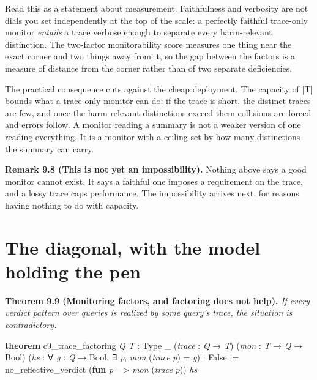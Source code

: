 \documentclass{memoir}
\begin{document}
Read this as a statement about measurement. Faithfulness and verbosity are not
dials you set independently at the top of the scale: a perfectly faithful
trace-only monitor \emph{entails} a trace verbose enough to separate every
harm-relevant distinction. The two-factor monitorability score measures one
thing near the exact corner and two things away from it, so the gap between the
factors is a measure of distance from the corner rather than of two separate
deficiencies.

The practical consequence cuts against the cheap deployment. The capacity of \LeanVerb|T|
bounds what a trace-only monitor can do: if the trace is short, the distinct
traces are few, and once the harm-relevant distinctions exceed them collisions
are forced and errors follow. A monitor reading a summary is not a weaker
version of one reading everything. It is a monitor with a ceiling set by how
many distinctions the summary can carry.

\textbf{Remark 9.8 (This is not yet an impossibility).} Nothing above says a good monitor
cannot exist. It says a faithful one imposes a requirement on the trace, and a
lossy trace caps performance. The impossibility arrives next, for reasons having
nothing to do with capacity.



\section{The diagonal, with the model holding the pen}\label{Two--Schemas--of--Impossibility-005F-005F-005F--Machine--Checked--Limits--of--Trustworthy--Machine--Learning-005F-005F-005F--and--Why--They--Tighten--with--Capability----The--Trace--Is--Not--a--Window----The--diagonal-005F-005F-005F--with--the--model--holding--the--pen}

\textbf{Theorem 9.9 (Monitoring factors, and factoring does not help).} \emph{If every verdict
pattern over queries is realized by some query's trace, the situation is
contradictory.}

\begin{LeanVerbatim}
\textbf{theorem} c9_trace_factoring \textit{Q} \textit{T} : Type _
    (\textit{trace} : \textit{Q} → \textit{T}) (\textit{mon} : \textit{T} → \textit{Q} → Bool)
    (\textit{hs} : ∀ \textit{g} : \textit{Q} → Bool, ∃ \textit{p}, \textit{mon} (\textit{trace} \textit{p}) = \textit{g}) : False :=
  no_reflective_verdict (\textbf{fun} \textit{p} => \textit{mon} (\textit{trace} \textit{p})) \textit{hs}

\end{LeanVerbatim}
\end{document}
